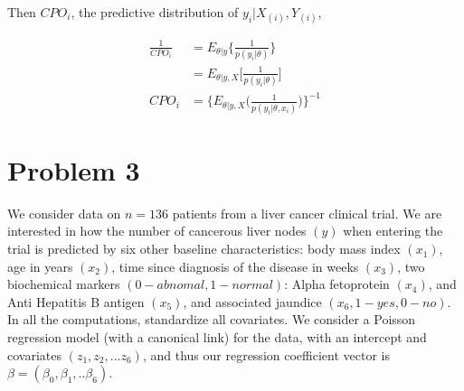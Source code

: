  Then $CPO_i$, the predictive distribution of $y_i | X_{(i)}, Y_{(i)}$,
 
\begin{align*}
 \frac{1}{CPO_i} & =  E_{\theta|y} \big \{ \frac{1}{p(y_i | \theta)} \big \}\\
&= E_{\theta|y, X} \big[\frac{1}{p(y_i | \theta)} \big] \\
CPO_i &= \Big \{ E_{\theta|y, X} \big( \frac{1}{p(y_i | \theta, x_i)} \big) \Big \}^{-1}
\end{align*}
 
\section{Problem 3}
We consider data on $n=136$ patients from a liver cancer clinical trial. We are interested in how the number of cancerous liver nodes $(y)$ when entering the trial is predicted by six other baseline characteristics: body mass index $(x_1)$, age in years $(x_2)$, time since diagnosis of the disease in weeks $(x_3)$, two biochemical markers $(0-abnomal, 1- normal)$: Alpha fetoprotein $(x_4)$, and Anti Hepatitis B antigen $(x_5)$, and associated jaundice $(x_6, 1- yes, 0-no)$. In all the computations, standardize all covariates. We consider a Poisson regression model (with a canonical link) for the data, with an intercept and covariates $(z_1, z_2,... z_6)$, and thus our regression coefficient vector is $\beta = (\beta_0, \beta_1,.. \beta_6)$. 

